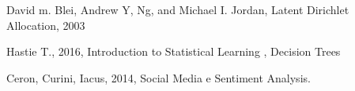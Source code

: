 \documentclass[runningheads]{llncs}
\begin{document}
%
%
%

\begin{thebibliography}{9}

David m. Blei, Andrew Y, Ng, and Michael I. Jordan, Latent Dirichlet Allocation, 2003

Hastie T., 2016, Introduction to Statistical Learning , Decision Trees
 
Ceron, Curini, Iacus, 2014,  Social Media e Sentiment Analysis. 
 

\end{thebibliography}
\end{document}

